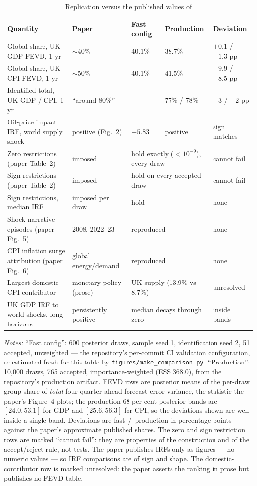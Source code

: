 \begin{table}[t]
\centering
\caption{Replication versus the published values of \citet{brignone2025}}
\label{tab:pubcompare}
\footnotesize
\begin{tabularx}{\textwidth}{@{}>{\raggedright\arraybackslash}Xllll@{}}
\toprule
Quantity & Paper & Fast config & Production & Deviation \\
\midrule
Global share, UK GDP FEVD, 1 yr & $\sim$40\% & 40.1\% & 38.7\% & $+0.1$ / $-1.3$ pp \\
Global share, UK CPI FEVD, 1 yr & $\sim$50\% & 40.1\% & 41.5\% & $-9.9$ / $-8.5$ pp \\
Identified total, UK GDP / CPI, 1 yr & ``around 80\%'' & --- & 77\% / 78\% & $-3$ / $-2$ pp \\
Oil-price impact IRF, world supply shock & positive (Fig.~2) & $+5.83$ & positive & sign matches \\
Zero restrictions (paper Table~2) & imposed & \multicolumn{2}{l}{hold exactly ($<10^{-9}$), every draw} & cannot fail \\
Sign restrictions (paper Table~2) & imposed & \multicolumn{2}{l}{hold on every accepted draw} & cannot fail \\
Sign restrictions, median IRF & imposed per draw & \multicolumn{2}{l}{hold} & none \\
Shock narrative episodes (paper Fig.~5) & 2008, 2022--23 & \multicolumn{2}{l}{reproduced} & none \\
CPI inflation surge attribution (paper Fig.~6) & global energy/demand & \multicolumn{2}{l}{reproduced} & none \\
Largest domestic CPI contributor & monetary policy (prose) & \multicolumn{2}{l}{UK supply (13.9\% vs 8.7\%)} & unresolved \\
UK GDP IRF to world shocks, long horizons & persistently positive & \multicolumn{2}{l}{median decays through zero} & inside bands \\
\bottomrule
\end{tabularx}
\par\smallskip
\parbox{0.97\textwidth}{\footnotesize \emph{Notes:} ``Fast config'': 600 posterior draws, sample seed 1, identification seed 2, 51 accepted, unweighted --- the repository's per-commit CI validation configuration, re-estimated fresh for this table by \texttt{figures/make\_comparison.py}. ``Production'': 10{,}000 draws, 765 accepted, importance-weighted (ESS 368.0), from the repository's production artifact. FEVD rows are posterior means of the per-draw group share of \emph{total} four-quarter-ahead forecast-error variance, the statistic the paper's Figure~4 plots; the production 68 per cent posterior bands are $[24.0, 53.1]$ for GDP and $[25.6, 56.3]$ for CPI, so the deviations shown are well inside a single band. Deviations are fast~/~production in percentage points against the paper's approximate published shares. The zero and sign restriction rows are marked ``cannot fail'': they are properties of the \citet{arias2018} construction and of the accept/reject rule, not tests. The paper publishes IRFs only as figures --- no numeric values --- so IRF comparisons are of sign and shape. The domestic-contributor row is marked unresolved: the paper asserts the ranking in prose but publishes no FEVD table.}

\end{table}
